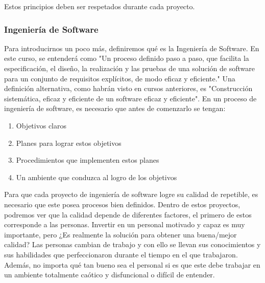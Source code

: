             Estos principios deben ser respetados durante cada proyecto.
            
            \newpage
            
            \subsubsection*{Ingeniería de Software}
            
            Para introducirnos un poco más, definiremos qué es la Ingeniería de Software. En este curso, se entenderá como "Un proceso definido paso a paso, que facilita la especificación, el diseño, la realización y las pruebas de una solución de software para un conjunto de requisitos explícitos, de modo eficaz y eficiente."
            Una definición alternativa, como habrán visto en cursos anteriores, es "Construcción sistemática, eficaz y eficiente de un software eficaz y eficiente". En un proceso de ingeniería de software, es necesario que antes de comenzarlo se tengan:
            
            \begin{enumerate}
                \item Objetivos claros
                \item Planes para lograr estos objetivos
                \item Procedimientos que implementen estos planes
                \item Un ambiente que conduzca al logro de los objetivos
            \end{enumerate}
            
            Para que cada proyecto de ingeniería de software logre su calidad de repetible, es necesario que este posea procesos bien definidos. Dentro de estos proyectos, podremos ver que la calidad depende de diferentes factores, el primero de estos corresponde a las personas. Invertir en un personal motivado y capaz es muy importante, pero ¿Es realmente la solución para obtener una buena/mejor calidad?
            Las personas cambian de trabajo y con ello se llevan sus conocimientos y sus habilidades que perfeccionaron durante el tiempo en el que trabajaron. Además, no importa qué tan bueno sea el personal si es que este debe trabajar en un ambiente totalmente caótico y disfuncional o difícil de entender.
            
